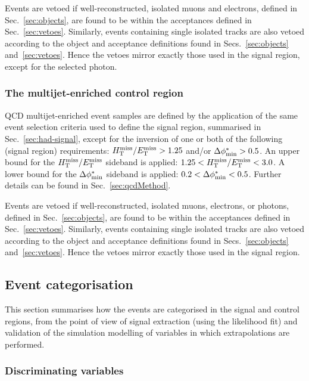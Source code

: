 Events are vetoed if well-reconstructed, isolated muons and electrons,
defined in Sec.~\ref{sec:objects}, are found to be within the
acceptances defined in Sec.~\ref{sec:vetoes}. Similarly, events
containing single isolated tracks are also vetoed according to the
object and acceptance definitions found in Secs.~\ref{sec:objects}
and~\ref{sec:vetoes}. Hence the vetoes mirror exactly those used in
the signal region, except for the selected photon.

\subsubsection{The multijet-enriched control region}
\label{sec:multijetcontrolSelection}

QCD multijet-enriched event samples are defined by the application of
the same event selection criteria used to define the signal region,
summarised in Sec.~\ref{sec:had-signal}, except for the inversion of
one or both of the following (signal region) requirements: $\mbox{$H_{\rm T}^{\rm miss}$}/\mbox{$E_\text{T}^{\rm miss}$}
> 1.25$ and/or $\mbox{$\Delta\phi^{*}_{\rm min}$} > 0.5$. An upper bound for the $\mbox{$H_{\rm T}^{\rm miss}$}/\mbox{$E_\text{T}^{\rm miss}$}$
sideband is applied: $1.25 < \mbox{$H_{\rm T}^{\rm miss}$}/\mbox{$E_\text{T}^{\rm miss}$} < 3.0$. A lower bound for the
$\mbox{$\Delta\phi^{*}_{\rm min}$}$ sideband is applied: $0.2 < \mbox{$\Delta\phi^{*}_{\rm min}$} < 0.5$. Further details
can be found in Sec.~\ref{sec:qcdMethod}.

Events are vetoed if well-reconstructed, isolated muons, electrons, or
photons, defined in Sec.~\ref{sec:objects}, are found to be within the
acceptances defined in Sec.~\ref{sec:vetoes}. Similarly, events
containing single isolated tracks are also vetoed according to the
object and acceptance definitions found in Secs.~\ref{sec:objects}
and~\ref{sec:vetoes}. Hence the vetoes mirror exactly those used in
the signal region.

\subsection{Event categorisation}
\label{sec:event-categorisation}

This section summarises how the events are categorised in the signal
and control regions, from the point of view of signal extraction
(using the likelihood fit) and validation of the simulation modelling
of variables in which extrapolations are performed.

\subsubsection{Discriminating variables}


